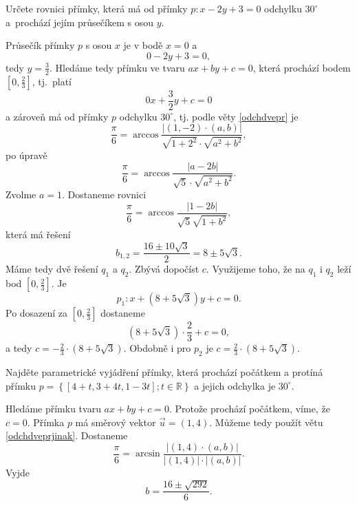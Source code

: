 \begin{priklad}
Určete rovnici přímky, která má od přímky $p\colon x-2y+3=0$ odchylku $30^\circ$ a~prochází
jejím průsečíkem s osou $y$.
\end{priklad}

\begin{reseni}
Průsečík přímky $p$ s osou $x$ je v bodě $x=0$ a
$$
    0-2y+3=0,
$$
tedy $y=\frac{3}{2}$. Hledáme tedy přímku ve tvaru $ax+by+c=0$, která prochází bodem $\left [ 0,\frac{2}{3} \right ] $,
tj.\ platí
$$
    0x + \frac{3}{2}y+c=0
$$
a zároveň má od přímky $p$ odchylku $30^\circ$, tj. podle věty \ref{odchdvepr} je
$$
\frac{\pi}{6}=\arccos \frac{|(1,-2)\cdot (a,b)|}{\sqrt{1+2^2} \cdot \sqrt{a^2 + b^2}},
$$
po úpravě
$$
\frac{\pi}{6} = \arccos \frac{|a-2b|}{\sqrt{5}\cdot \sqrt{a^2+b^2}}.
$$
Zvolme $a=1$. Dostaneme rovnici
$$
\frac{\pi}{6} = \arccos \frac{|1-2b|}{\sqrt{5} \sqrt{1+b^2}},
$$
která má řešení
$$
    b_{1,2} = \frac{16\pm 10 \sqrt{3}}{2} = 8 \pm 5 \sqrt{3}.
$$
Máme tedy dvě řešení $q_1$ a $q_2$. Zbývá dopočíst $c$. Využijeme toho, že na $q_1$ i $q_2$ leží bod $\left [ 0, \frac{2}{3} \right ] $.
Je
$$
    p_1 \colon x + (8 + 5 \sqrt{3}) y +c=0.
$$
Po dosazení za $\left [ 0, \frac{2}{3} \right ] $ dostaneme
$$
    (8 + 5 \sqrt{3}) \cdot \frac{2}{3} + c = 0,
$$
a tedy $c = - \frac{2}{3} \cdot (8 + 5 \sqrt{3})$. Obdobně i pro $p_2$ je $c= \frac{2}{3} \cdot (8 + 5 \sqrt{3})$.
\end{reseni}

\begin{priklad}
Najděte parametrické vyjádření přímky, která prochází počátkem a protíná přímku $p=\left \{ [4+t,3+4t,1-3t]; t\in \mathbb R \right \} $
a jejich odchylka je $30^\circ$.
\end{priklad}

\begin{reseni}
Hledáme přímku tvaru $ax+by+c=0$. Protože prochází počátkem, víme, že $c=0$. Přímka $p$ má směrový vektor
$\vec u = (1,4)$. Můžeme tedy použít větu \ref{odchdveprjinak}. Dostaneme
$$
\frac{\pi}{6} = \arcsin \frac{|(1,4)\cdot (a,b)|}{|(1,4)|\cdot |(a,b)|}.
$$
Vyjde
$$
    b= \frac{16 \pm \sqrt{292}}{6}.
$$
\end{reseni}
